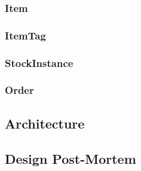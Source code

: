 \lipsum[2-3]

\subsubsection{Item}
\subsubsection{ItemTag}
\subsubsection{StockInstance}
\subsubsection{Order}

\subsection{Architecture} \label{subsec:Architecture}
\subsection{Design Post-Mortem}
